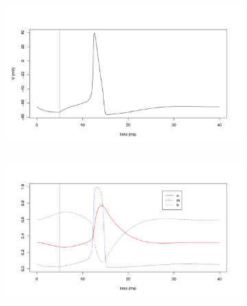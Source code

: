 \documentclass{article}
\begin{document}
\begin{figure}[h]
	\centering
	\begin{subfigure}[t]{0.45\linewidth}
		\centering
		\includegraphics[width = 1.0\linewidth, trim={20 60 40 70}, clip=true]{hh_jump_V.png}
		\label{fig:hhV}	
	\end{subfigure}%
	\hspace{0.05\linewidth}
	\begin{subfigure}[t]{0.45\linewidth}
		\centering
		\includegraphics[width = 1.0\linewidth, trim={20 60 40 70}, clip=true]{hh_jump_gating.png}
		\label{fig:hhV}	
	\end{subfigure}%

\end{figure}
\end{document}
